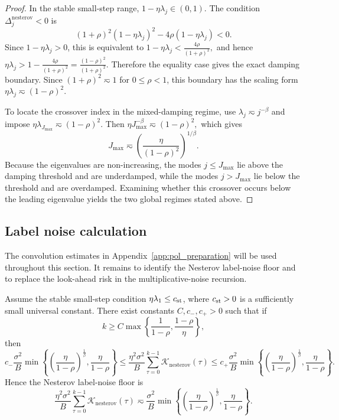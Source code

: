 \documentclass[11pt]{article}
\newcommand{\nesterov}{\mathrm{nesterov}}
\begin{document}
\begin{proof}
In the stable small-step range, $1-\eta\lambda_j\in(0,1)$. The condition $\Delta_j^{\nesterov}<0$ is
\[
    (1+\rho)^2(1-\eta\lambda_j)^2
    -4\rho(1-\eta\lambda_j)<0.
\]
Since $1-\eta\lambda_j>0$, this is equivalent to
$1-\eta\lambda_j<\frac{4\rho}{(1+\rho)^2},$
and hence
$\eta\lambda_j>1-\frac{4\rho}{(1+\rho)^2}=\frac{(1-\rho)^2}{(1+\rho)^2}.$
Therefore the equality case gives the exact damping boundary. Since $(1+\rho)^2\eqsim1$ for $0\le\rho<1$, this boundary has the scaling form $\eta\lambda_j\eqsim(1-\rho)^2$.

To locate the crossover index in the mixed-damping regime, use $\lambda_j\eqsim j^{-\beta}$ and impose
$\eta\lambda_{J_{\max}}\eqsim(1-\rho)^2.$
Then
$\eta J_{\max}^{-\beta}\eqsim(1-\rho)^2,$
which gives
\[
    J_{\max}
    \eqsim
    \left(\frac{\eta}{(1-\rho)^2}\right)^{1/\beta}.
\]
Because the eigenvalues are non-increasing, the modes $j\le J_{\max}$ lie above the damping threshold and are underdamped, while the modes $j>J_{\max}$ lie below the threshold and are overdamped. Examining whether this crossover occurs below the leading eigenvalue yields the two global regimes stated above.
\end{proof}


\subsection{Label noise calculation}
\label{app:nes_preparation}

The convolution estimates in Appendix~\ref{app:pol_preparation} will be used throughout this section. It remains to identify the Nesterov label-noise floor and to replace the look-ahead risk in the multiplicative-noise recursion.

\begin{lemma}
\label{lem:nes_label_noise}
Assume the stable small-step condition \(\eta\lambda_1\le c_{\rm st}\), where \(c_{\rm st}>0\) is a
sufficiently small universal constant.  There exist constants \(C,c_-,c_+>0\) such that if
\[
    k\ge
    C\max\left\{\frac1{1-\rho},\frac{1-\rho}{\eta}\right\},
\]
then
\[
    c_-\frac{\sigma^2}{B}
    \min\left\{
        \left(\frac{\eta}{1-\rho}\right)^{\frac1\beta},
        \frac{\eta}{1-\rho}
    \right\}
    \le
    \frac{\eta^2\sigma^2}{B}\sum_{\tau=0}^{k-1}\mathcal K_{\nesterov}(\tau)
    \le
    c_+\frac{\sigma^2}{B}
    \min\left\{
        \left(\frac{\eta}{1-\rho}\right)^{\frac1\beta},
        \frac{\eta}{1-\rho}
    \right\}.
\]
Hence the Nesterov label-noise floor is
\[
    \frac{\eta^2\sigma^2}{B}\sum_{\tau=0}^{k-1}\mathcal K_{\nesterov}(\tau)
    \eqsim
    \frac{\sigma^2}{B}
    \min\left\{
        \left(\frac{\eta}{1-\rho}\right)^{\frac1\beta},
        \frac{\eta}{1-\rho}
    \right\}.
\]
\end{lemma}
\end{document}
